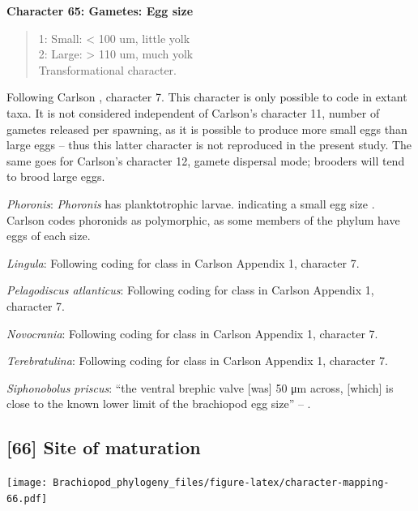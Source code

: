 \documentclass[]{book}
\theoremstyle{definition}
\theoremstyle{definition}
\theoremstyle{definition}
\theoremstyle{remark}
\begin{document}
\textbf{Character 65: Gametes: Egg size}

\begin{quote}
1: Small: \textless{} 100 um, little yolk\\
2: Large: \textgreater{} 110 um, much yolk\\
Transformational character.
\end{quote}

Following Carlson \citeyearpar{Carlson1995Phylogeneticrelationships},
character 7. This character is only possible to code in extant taxa. It
is not considered independent of Carlson's character 11, number of
gametes released per spawning, as it is possible to produce more small
eggs than large eggs -- thus this latter character is not reproduced in
the present study. The same goes for Carlson's character 12, gamete
dispersal mode; brooders will tend to brood large eggs.

\emph{Phoronis}: \emph{Phoronis} has planktotrophic larvae. indicating a
small egg size \citep{Ruppert2004}. Carlson
\citeyearpar{Carlson1995Phylogeneticrelationships} codes phoronids as
polymorphic, as some members of the phylum have eggs of each size.

\emph{Lingula}: Following coding for class in Carlson
\citeyearpar{Carlson1995Phylogeneticrelationships} Appendix 1, character
7.

\emph{Pelagodiscus atlanticus}: Following coding for class in Carlson
\citeyearpar{Carlson1995Phylogeneticrelationships} Appendix 1, character
7.

\emph{Novocrania}: Following coding for class in Carlson
\citeyearpar{Carlson1995Phylogeneticrelationships} Appendix 1, character
7.

\emph{Terebratulina}: Following coding for class in Carlson
\citeyearpar{Carlson1995Phylogeneticrelationships} Appendix 1, character
7.

\emph{Siphonobolus priscus}: ``the ventral brephic valve {[}was{]} 50 μm
across, {[}which{]} is close to the known lower limit of the brachiopod
egg size'' -- \citet{Popov2009Earlyontogeny}.

\hypertarget{site-of-maturation}{%
\subsection*{{[}66{]} Site of maturation}\label{site-of-maturation}}

\texttt{[image: Brachiopod\_phylogeny\_files/figure-latex/character-mapping-66.pdf]}
\end{document}
